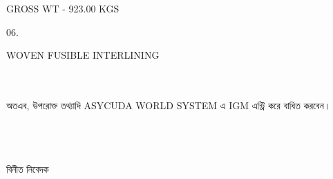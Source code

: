 \documentclass[12pt]{article}
\begin{document}
\begin{minipage}{0.95\linewidth}
GROSS WT - 923.00 KGS
\end{minipage}
\begin{minipage}{0.05\linewidth}
06.
\end{minipage}
\begin{minipage}{0.95\linewidth}
WOVEN FUSIBLE INTERLINING
\end{minipage}
\\
\\
অতএব, উপরোক্ত তথ্যাদি ASYCUDA WORLD SYSTEM এ IGM এন্ট্রি করে বাধিত করবেন।
\\
\\
\\
\\
\begin{minipage}[t]{0.50\linewidth}
\hspace{1em}
\end{minipage}
\begin{minipage}[t]{0.60\linewidth}
বিনীত নিবেদক
\\
\\
\\
\\
\\
{\cnfn}
\end{minipage}
\thispagestyle{laststyle}
\end{document}
